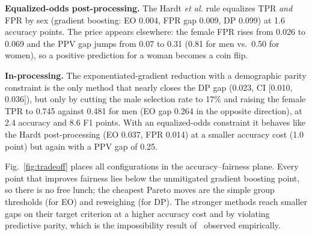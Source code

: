 \documentclass[conference]{IEEEtran}
\begin{document}
\textbf{Equalized-odds post-processing.} The Hardt \textit{et al.} rule equalizes TPR \emph{and} FPR by sex (gradient boosting: EO 0.004, FPR gap 0.009, DP 0.099) at 1.6 accuracy points. The price appears elsewhere: the female FPR rises from 0.026 to 0.069 and the PPV gap jumps from 0.07 to 0.31 (0.81 for men vs.\ 0.50 for women), so a positive prediction for a woman becomes a coin flip.

\textbf{In-processing.} The exponentiated-gradient reduction with a demographic parity constraint is the only method that nearly closes the DP gap (0.023, CI [0.010, 0.036]), but only by cutting the male selection rate to 17\% and raising the female TPR to 0.745 against 0.481 for men (EO gap 0.264 in the opposite direction), at 2.4 accuracy and 8.6 F1 points. With an equalized-odds constraint it behaves like the Hardt post-processing (EO 0.037, FPR 0.014) at a smaller accuracy cost (1.0 point) but again with a PPV gap of 0.25.

Fig.~\ref{fig:tradeoff} places all configurations in the accuracy--fairness plane. Every point that improves fairness lies below the unmitigated gradient boosting point, so there is no free lunch; the cheapest Pareto moves are the simple group thresholds (for EO) and reweighing (for DP). The stronger methods reach smaller gaps on their target criterion at a higher accuracy cost and by violating predictive parity, which is the impossibility result of~\cite{kleinberg2017,chouldechova2017} observed empirically.
\end{document}
